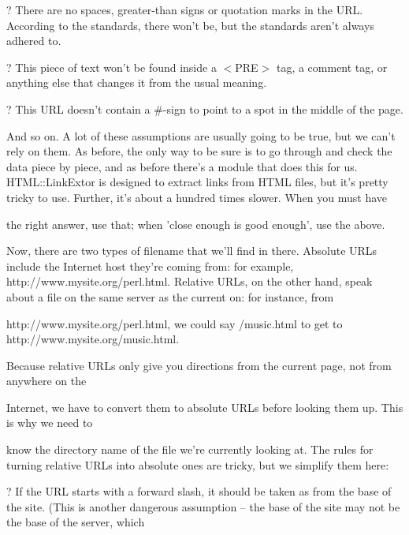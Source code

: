 \documentclass[a4paper,11pt]{book}
\begin{document}
\noindent 

\noindent ? There are no spaces, greater-than signs or quotation marks in the URL. According to the standards, there won't be, but the standards aren't always adhered to.

\noindent ? This piece of text won't be found inside a $<$PRE$>$ tag, a comment tag, or anything else that changes it from the usual meaning.

\noindent 

\noindent ? This URL doesn't contain a \#-sign to point to a spot in the middle of the page.

\noindent 

\noindent And so on. A lot of these assumptions are usually going to be true, but we can't rely on them. As before, the only way to be sure is to go through and check the data piece by piece, and as before there's a module that does this for us. HTML::LinkExtor is designed to extract links from HTML files, but it's pretty tricky to use. Further, it's about a hundred times slower. When you must have

\noindent the right answer, use that; when 'close enough is good enough', use the above.

\noindent 

\noindent Now, there are two types of filename that we'll find in there. Absolute URLs include the Internet host they're coming from: for example, http://www.mysite.org/perl.html. Relative URLs, on the other hand, speak about a file on the same server as the current on: for instance, from

\noindent http://www.mysite.org/perl.html, we could say /music.html to get to http://www.mysite.org/music.html.

\noindent Because relative URLs only give you directions from the current page, not from anywhere on the

\noindent 

\noindent 

\noindent Internet, we have to convert them to absolute URLs before looking them up. This is why we need to

\noindent know the directory name of the file we're currently looking at. The rules for turning relative URLs into absolute ones are tricky, but we simplify them here:

\noindent 

\noindent ? If the URL starts with a forward slash, it should be taken as from the base of the site. (This is another dangerous assumption -- the base of the site may not be the base of the server, which
\end{document}
